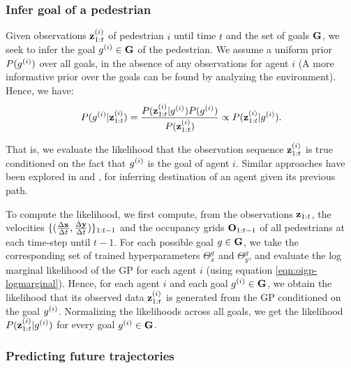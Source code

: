 \subsubsection{Infer goal of a pedestrian}
\label{sec:oigp-infer}

Given observations $\mathbf{z}^{(i)}_{1:t}$ of pedestrian $i$ until time $t$
and the set of goals $\mathbf{G}$, we seek to infer the goal
$g^{(i)} \in \mathbf{G}$ of the pedestrian. We assume a uniform prior
$P(g^{(i)})$ over all goals, in the absence of any observations for
agent $i$ (A more informative prior over the goals can be found by
analyzing the environment). Hence, we have:
\begin{equation}
  \label{eq:oigp-1}
  P(g^{(i)}|\mathbf{z}^{(i)}_{1:t}) = \frac{P(\mathbf{z}^{(i)}_{1:t}|g^{(i)}) P(g^{(i)})}{P(\mathbf{z}^{(i)}_{1:t})} \propto P(\mathbf{z}^{(i)}_{1:t}|g^{(i)}).
\end{equation}

That is, we evaluate the likelihood that the observation sequence
$\mathbf{z}^{(i)}_{1:t}$ is true conditioned on the fact that $g^{(i)}$ is
the goal of agent $i$. Similar approaches have been explored in
\cite{kitani12} and \cite{ziebart09}, for inferring destination of an
agent given its previous path.
 
%
%
%
%
%
%
%
%
%
To compute the likelihood, we first compute, from the observations
$\mathbf{z}_{1:t}$, the velocities $\{(\frac{\Delta \mathbf{x}}{\Delta t}, \frac{\Delta \mathbf{y}}{\Delta t})\}_{1:t-1}$ and the
occupancy grids $\mathbf{O}_{1:t-1}$ of all pedestrians at each time-step
until $t-1$.  For each possible goal $g \in \mathbf{G}$, we take the
corresponding set of trained hyperparameters $\Theta_x^g$ and
$\Theta_y^g$, and evaluate the log marginal likelihood of the GP for
each agent $i$ (using equation \ref{eqn:oigp-logmarginal}).
%
%
%
%
Hence, for each agent $i$ and each goal $g^{(i)} \in \mathbf{G}$, we obtain
the likelihood that its observed data $\mathbf{z}^{(i)}_{1:t}$ is generated
from the GP conditioned on the goal $g^{(i)}$. Normalizing the
likelihoods across all goals, we get the likelihood
$P(\mathbf{z}_{1:t}^{(i)}|g^{(i)})$ for every goal $g^{(i)} \in \mathbf{G}$.


\subsubsection{Predicting future trajectories}
\label{sec:oigp-pred-future-traj}

